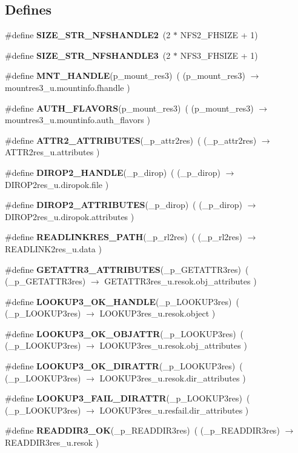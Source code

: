 \subsection*{Defines}
\begin{CompactItemize}
\item 
\#define {\bf SIZE\_\-STR\_\-NFSHANDLE2}\ (2 $\ast$ NFS2\_\-FHSIZE + 1)
\item 
\#define {\bf SIZE\_\-STR\_\-NFSHANDLE3}\ (2 $\ast$ NFS3\_\-FHSIZE + 1)
\item 
\#define {\bf MNT\_\-HANDLE}(p\_\-mount\_\-res3)\ ( (p\_\-mount\_\-res3) $\rightarrow$ mountres3\_\-u.mountinfo.fhandle )
\item 
\#define {\bf AUTH\_\-FLAVORS}(p\_\-mount\_\-res3)\ ( (p\_\-mount\_\-res3) $\rightarrow$ mountres3\_\-u.mountinfo.auth\_\-flavors )
\item 
\#define {\bf ATTR2\_\-ATTRIBUTES}(\_\-p\_\-attr2res)\ ( (\_\-p\_\-attr2res) $\rightarrow$ ATTR2res\_\-u.attributes )
\item 
\#define {\bf DIROP2\_\-HANDLE}(\_\-p\_\-dirop)\ ( (\_\-p\_\-dirop) $\rightarrow$ DIROP2res\_\-u.diropok.file )
\item 
\#define {\bf DIROP2\_\-ATTRIBUTES}(\_\-p\_\-dirop)\ ( (\_\-p\_\-dirop) $\rightarrow$ DIROP2res\_\-u.diropok.attributes )
\item 
\#define {\bf READLINKRES\_\-PATH}(\_\-p\_\-rl2res)\ ( (\_\-p\_\-rl2res) $\rightarrow$ READLINK2res\_\-u.data )
\item 
\#define {\bf GETATTR3\_\-ATTRIBUTES}(\_\-p\_\-GETATTR3res)\ ( (\_\-p\_\-GETATTR3res) $\rightarrow$ GETATTR3res\_\-u.resok.obj\_\-attributes )
\item 
\#define {\bf LOOKUP3\_\-OK\_\-HANDLE}(\_\-p\_\-LOOKUP3res)\ ( (\_\-p\_\-LOOKUP3res) $\rightarrow$ LOOKUP3res\_\-u.resok.object )
\item 
\#define {\bf LOOKUP3\_\-OK\_\-OBJATTR}(\_\-p\_\-LOOKUP3res)\ ( (\_\-p\_\-LOOKUP3res) $\rightarrow$ LOOKUP3res\_\-u.resok.obj\_\-attributes )
\item 
\#define {\bf LOOKUP3\_\-OK\_\-DIRATTR}(\_\-p\_\-LOOKUP3res)\ ( (\_\-p\_\-LOOKUP3res) $\rightarrow$ LOOKUP3res\_\-u.resok.dir\_\-attributes )
\item 
\#define {\bf LOOKUP3\_\-FAIL\_\-DIRATTR}(\_\-p\_\-LOOKUP3res)\ ( (\_\-p\_\-LOOKUP3res) $\rightarrow$ LOOKUP3res\_\-u.resfail.dir\_\-attributes )
\item 
\#define {\bf READDIR3\_\-OK}(\_\-p\_\-READDIR3res)\ ( (\_\-p\_\-READDIR3res) $\rightarrow$ READDIR3res\_\-u.resok )
\item 

\end{CompactItemize}
